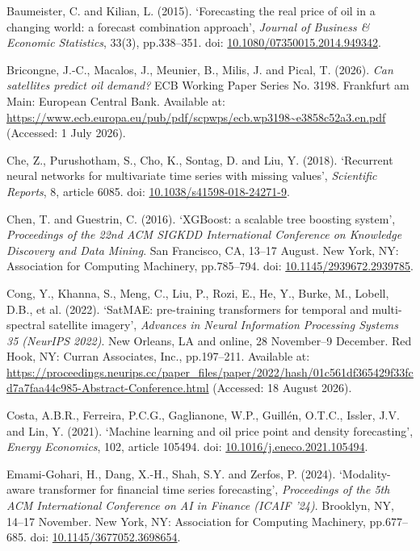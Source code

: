 \documentclass[
  british,
  12pt,
  oneside]{book}
\newcounter{none} %
\newlength{\cslhangindent}
\newenvironment{CSLReferences}[2] %
 {\begin{list}{}{%
  \setlength{\itemindent}{0pt}
  \setlength{\leftmargin}{0pt}
  \setlength{\parsep}{0pt}
  \ifodd #1
   \setlength{\leftmargin}{\cslhangindent}
   \setlength{\itemindent}{-1\cslhangindent}
  \fi
  \setlength{\itemsep}{#2\baselineskip}}}
 {\end{list}}
\begin{document}
\begin{CSLReferences}{0}{1}
Baumeister, C. and Kilian, L. (2015). {`{Forecasting the real price of oil in a changing world: a forecast combination approach}'}, \emph{Journal of Business \& Economic Statistics}, 33(3), pp.338--351. doi: \href{https://doi.org/10.1080/07350015.2014.949342}{10.1080/07350015.2014.949342}.

Bricongne, J.-C., Macalos, J., Meunier, B., Milis, J. and Pical, T. (2026). \emph{{Can satellites predict oil demand?}} ECB Working Paper Series No. 3198. Frankfurt am Main: European Central Bank. Available at: \url{https://www.ecb.europa.eu/pub/pdf/scpwps/ecb.wp3198~e3858c52a3.en.pdf} (Accessed: 1 July 2026).

Che, Z., Purushotham, S., Cho, K., Sontag, D. and Liu, Y. (2018). {`{Recurrent neural networks for multivariate time series with missing values}'}, \emph{Scientific Reports}, 8, article 6085. doi: \href{https://doi.org/10.1038/s41598-018-24271-9}{10.1038/s41598-018-24271-9}.

Chen, T. and Guestrin, C. (2016). {`{{XGBoost}: a scalable tree boosting system}'}, \emph{{Proceedings of the 22nd ACM SIGKDD International Conference on Knowledge Discovery and Data Mining}}. San Francisco, CA, 13--17 August. New York, NY: Association for Computing Machinery, pp.785--794. doi: \href{https://doi.org/10.1145/2939672.2939785}{10.1145/2939672.2939785}.

Cong, Y., Khanna, S., Meng, C., Liu, P., Rozi, E., He, Y., Burke, M., Lobell, D.B., et al. (2022). {`{{SatMAE}: pre-training transformers for temporal and multi-spectral satellite imagery}'}, \emph{{Advances in Neural Information Processing Systems 35 ({NeurIPS} 2022)}}. New Orleans, LA and online, 28 November--9 December. Red Hook, NY: Curran Associates, Inc., pp.197--211. Available at: \url{https://proceedings.neurips.cc/paper_files/paper/2022/hash/01c561df365429f33fcd7a7faa44c985-Abstract-Conference.html} (Accessed: 18 August 2026).

Costa, A.B.R., Ferreira, P.C.G., Gaglianone, W.P., Guillén, O.T.C., Issler, J.V. and Lin, Y. (2021). {`{Machine learning and oil price point and density forecasting}'}, \emph{Energy Economics}, 102, article 105494. doi: \href{https://doi.org/10.1016/j.eneco.2021.105494}{10.1016/j.eneco.2021.105494}.

Emami-Gohari, H., Dang, X.-H., Shah, S.Y. and Zerfos, P. (2024). {`{Modality-aware transformer for financial time series forecasting}'}, \emph{{Proceedings of the 5th ACM International Conference on AI in Finance (ICAIF '24)}}. Brooklyn, NY, 14--17 November. New York, NY: Association for Computing Machinery, pp.677--685. doi: \href{https://doi.org/10.1145/3677052.3698654}{10.1145/3677052.3698654}.


\end{CSLReferences}
\end{document}
